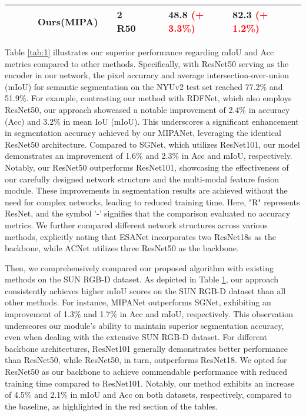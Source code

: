\documentclass{aims}
\numberwithin{equation}{section}
\begin{document}
\begin{table}[t]
\begin{tabular}{lllllllllllll}
          &       &       & Ours(MIPA) &       &        2   R50 &       &       & \textbf{48.8} \textcolor{red}{(+ 3.3\%)} &       &        \textbf{82.3} \textcolor{red}{(+ 1.2\%)} \\
    \bottomrule
    \end{tabular}\label{tab:2}\end{table}Table \ref{tab:1} illustrates our superior performance regarding mIoU and Acc metrics compared to other methods. Specifically, with ResNet50 serving as the encoder in our network, the pixel accuracy and average intersection-over-union (mIoU) for semantic segmentation on the NYUv2 test set reached 77.2\% and 51.9\%. For example, contrasting our method with RDFNet, which also employs ResNet50, our approach showcased a notable improvement of 2.4\% in accuracy (Acc) and 3.2\% in mean IoU (mIoU). This underscores a significant enhancement in segmentation accuracy achieved by our MIPANet, leveraging the identical ResNet50 architecture. Compared to SGNet, which utilizes ResNet101, our model demonstrates an improvement of 1.6\% and 2.3\% in Acc and mIoU, respectively. Notably, our ResNet50 outperforms ResNet101, showcasing the effectiveness of our carefully designed network structure and the multi-modal feature fusion module. These improvements in segmentation results are achieved without the need for complex networks, leading to reduced training time. Here, "R" represents ResNet, and the symbol '-' signifies that the comparison evaluated no accuracy metrics. We further compared different network structures across various methods, explicitly noting that ESANet incorporates two ResNet18s as the backbone, while ACNet utilizes three ResNet50 as the backbone.

Then, we comprehensively compared our proposed algorithm with existing methods on the SUN RGB-D dataset. As depicted in Table \ref{tab:2}, our approach consistently achieves higher mIoU scores on the SUN RGB-D dataset than all other methods.   For instance, MIPANet outperforms SGNet, exhibiting an improvement of 1.3\% and 1.7\% in Acc and mIoU, respectively. This observation underscores our module's ability to maintain superior segmentation accuracy, even when dealing with the extensive SUN RGB-D dataset. For different backbone architectures, ResNet101 generally demonstrates better performance than ResNet50, while ResNet50, in turn, outperforms ResNet18. We opted for ResNet50 as our backbone to achieve commendable performance with reduced training time compared to ResNet101.  Notably, our method exhibits an increase of 4.5\% and 2.1\% in mIoU and Acc on both datasets, respectively, compared to the baseline, as highlighted in the red section of the tables.
\end{document}
